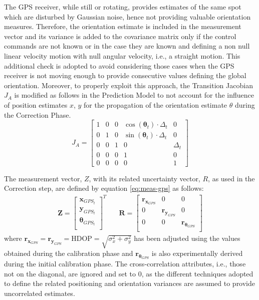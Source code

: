 The \gls{GPS} receiver, while still or rotating, provides estimates of the same spot which are disturbed by Gaussian noise, hence not providing valuable orientation measures.
Therefore, the orientation estimate is included in the measurement vector and its variance is added to the covariance matrix only if the control commands are not known or in the case they are known and defining a non null linear velocity  motion with null angular velocity,  i.e., a straight motion.
This additional check is adopted to avoid considering those cases when the \gls{GPS} receiver is not moving enough to provide consecutive values defining the global orientation.
Moreover, to properly exploit this approach, the Transition Jacobian $J_A$ is modified as follows in the Prediction Model to not account for the influence of position estimates $x$, $y$ for the propagation of the orientation estimate $\theta$ during the Correction Phase.
\begin{equation}
	\label{eq:j-a}
	J_A
	=
	\begin{bmatrix}
		1 & 0 & 0 & \cos(\boldsymbol \theta_t) \cdot \Delta_t & 0  \\
		0 & 1 & 0 & \sin(\boldsymbol \theta_t) \cdot \Delta_t &  0  \\
		0 & 0 & 1 & 0 & \Delta_t \\
		0 & 0 & 0 & 1 & 0  \\
		0 & 0 & 0 & 0 & 1  
	\end{bmatrix}
\end{equation}

The measurement vector, $Z$, with its related uncertainty vector, $R$, as used in the Correction step, are defined by equation \eqref{eq:meas-gps} as follows:  
\begin{align}
\label{eq:meas-gps}
\mathbf{Z}
=
\begin{bmatrix}
\mathbf{x}_{GPS_t} \\
\mathbf{y}_{GPS_t} \\
\boldsymbol \theta_{GPS_t} \\
\end{bmatrix}^T
& \quad
\mathbf{R}
=
\begin{bmatrix}
\mathbf{r}_{\mathbf{x}_{GPS}} & 0 & 0 \\
0 & \mathbf{r}_{\mathbf{y}_{GPS}} & 0 \\
0 & 0 & \mathbf{r}_{\boldsymbol \theta_{GPS}} \\
\end{bmatrix}
\end{align}
where $\mathbf{r}_{\mathbf{x}_{GPS}} = \mathbf{r}_{\mathbf{y}_{GPS}} = \text{HDOP} = \sqrt{\sigma_x^2 + \sigma_y^2}$ has been adjusted using the values obtained during the calibration phase and
$ \mathbf{r}_{\boldsymbol \theta_{GPS}}$ is also experimentally derived during the initial calibration phase.
The cross-correlation attributes, i.e., those not on the diagonal, are ignored and set to $0$, as the different techniques adopted to define the related positioning and orientation variances are assumed to provide uncorrelated estimates.

